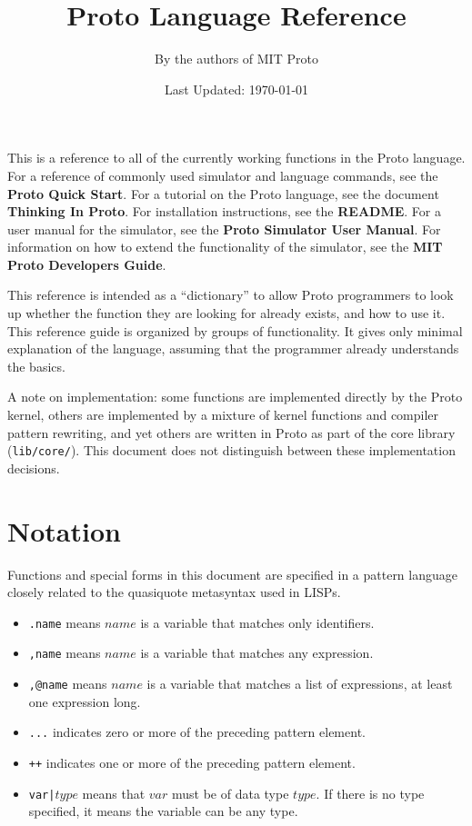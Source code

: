 \documentclass{article}
\title{Proto Language Reference}
\author{By the authors of MIT Proto}
\date{Last Updated: \today}
\newcommand\type[1]{$#1$}
\begin{document}
\maketitle

This is a reference to all of the currently working functions in the
Proto language.  For a reference of commonly used simulator and
language commands, see the {\bf Proto Quick Start}.  For a tutorial on
the Proto language, see the document {\bf Thinking In Proto}.  For
installation instructions, see the {\bf README}.  For a user manual
for the simulator, see the {\bf Proto Simulator User Manual}.  For
information on how to extend the functionality of the simulator, see
the {\bf MIT Proto Developers Guide}.

This reference is intended as a ``dictionary'' to allow Proto
programmers to look up whether the function they are looking for
already exists, and how to use it.  This reference guide is organized
by groups of functionality.  It gives only minimal explanation of the
language, assuming that the programmer already understands the basics.

A note on implementation: some functions are implemented directly by
the Proto kernel, others are implemented by a mixture of kernel
functions and compiler pattern rewriting, and yet others are written
in Proto as part of the core library ({\tt lib/core/}).  This document
does not distinguish between these implementation decisions.




\section{Notation}

Functions and special forms in this document are specified in a
pattern language closely related to the quasiquote metasyntax used in
LISPs.
\begin{itemize}
\item {\tt .name} means $name$ is a variable that matches only identifiers. 
\item {\tt ,name} means $name$ is a variable that matches any expression.
\item {\tt ,@name} means $name$ is a variable that matches a list of
  expressions, at least one expression long.
\item {\tt ...} indicates zero or more of the preceding pattern element.
\item {\tt ++} indicates one or more of the preceding pattern element.
\item {\tt var|\type{type}} means that $var$ must be of data type
  $type$.  If there is no type specified, it means the variable can be
  any type.
\end{itemize}
\end{document}

